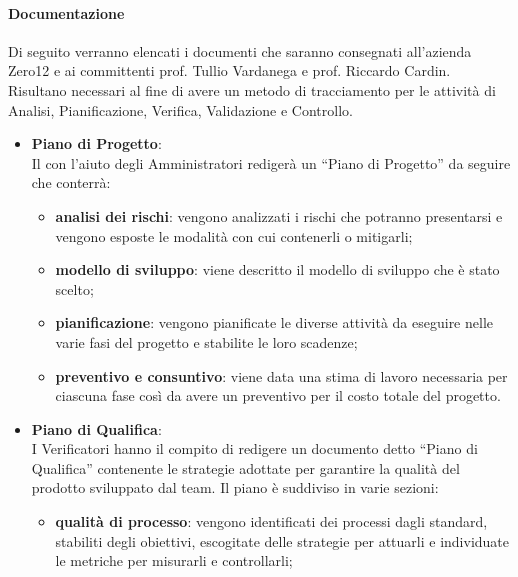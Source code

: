             \paragraph{Documentazione}
                Di seguito verranno elencati i documenti che saranno consegnati all’azienda Zero12 e ai committenti prof. Tullio Vardanega e prof. Riccardo Cardin. Risultano necessari al fine di avere un metodo di tracciamento per le attività di Analisi, Pianificazione, Verifica, Validazione e Controllo.\\
                \begin{itemize}
                    \item\textbf{Piano di Progetto}:\\
                        Il  con l’aiuto degli Amministratori redigerà un “Piano di Progetto” da seguire che conterrà: \\
                        \begin{itemize}
                            \item\textbf{analisi dei rischi}: vengono analizzati i rischi che potranno presentarsi e vengono esposte le modalità con cui contenerli o mitigarli;
                            \item\textbf{modello di sviluppo}: viene descritto il modello di sviluppo che è stato scelto;
                            \item\textbf{pianificazione}: vengono pianificate le diverse attività da eseguire nelle varie fasi del progetto e stabilite le loro scadenze;
                            \item\textbf{preventivo e consuntivo}: viene data una stima di lavoro necessaria per ciascuna fase così da avere un preventivo per il costo totale del progetto.
                        \end{itemize}
                    \item\textbf{Piano di Qualifica}:\\
                        I Verificatori hanno il compito di redigere un documento detto “Piano di Qualifica” contenente le strategie adottate per garantire la qualità del prodotto sviluppato dal team.
                        Il piano è suddiviso in varie sezioni:
                        \begin{itemize}
                            \item\textbf{qualità di processo}: vengono identificati dei processi dagli standard, stabiliti degli obiettivi, escogitate delle strategie per attuarli e individuate le metriche per misurarli e controllarli;

\end{itemize}
\end{itemize}
